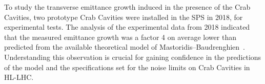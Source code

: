 
To study the transverse emittance growth induced in the presence of the Crab Cavities, two prototype Crab Cavities were installed in the SPS in 2018, for experimental tests. The analysis of the experimental data from 2018 indicated that the measured emittance growth was a factor 4 on average lower than predicted from the available theoretical model of Mastoridis--Baudrenghien~\cite{PhysRevSTAB.18.101001}. Understanding this observation is crucial for gaining confidence in the predictions of the model and the specifications set for the noise limits on Crab Cavities in HL-LHC.%





